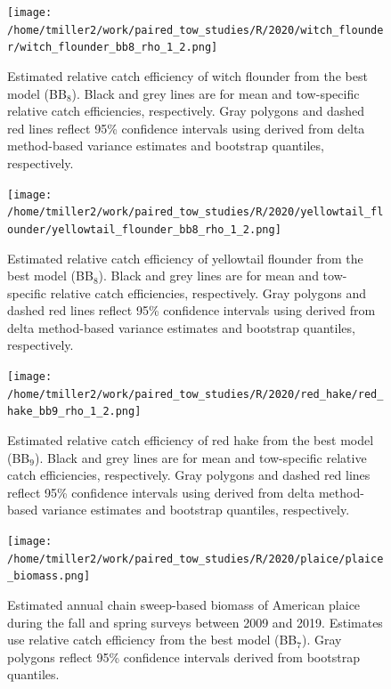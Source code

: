 \documentclass[12pt,letterpaper, leqno]{article}
\begin{document}
\begin{landscape}
\begin{figure}
\caption{Estimated relative catch efficiency of witch flounder from the best model (BB$_8$). Black and grey lines are for mean and tow-specific relative catch efficiencies, respectively. Gray polygons and dashed red lines reflect 95\% confidence intervals using derived from delta method-based variance estimates and bootstrap quantiles, respectively.}\label{combined_rhos_witch}
\begin{center}
\texttt{[image: /home/tmiller2/work/paired\_tow\_studies/R/2020/witch\_flounder/witch\_flounder\_bb8\_rho\_1\_2.png]}
\end{center}
\end{figure}

\begin{figure}
\caption{Estimated relative catch efficiency of yellowtail flounder from the best model (BB$_8$). Black and grey lines are for mean and tow-specific relative catch efficiencies, respectively. Gray polygons and dashed red lines reflect 95\% confidence intervals using derived from delta method-based variance estimates and bootstrap quantiles, respectively.}\label{combined_rhos_ytf}
\begin{center}
\texttt{[image: /home/tmiller2/work/paired\_tow\_studies/R/2020/yellowtail\_flounder/yellowtail\_flounder\_bb8\_rho\_1\_2.png]}
\end{center}
\end{figure}

\begin{figure}
\caption{Estimated relative catch efficiency of red hake from the best model (BB$_9$). Black and grey lines are for mean and tow-specific relative catch efficiencies, respectively. Gray polygons and dashed red lines reflect 95\% confidence intervals using derived from delta method-based variance estimates and bootstrap quantiles, respectively.}\label{combined_rhos_redhake}
\begin{center}
\texttt{[image: /home/tmiller2/work/paired\_tow\_studies/R/2020/red\_hake/red\_hake\_bb9\_rho\_1\_2.png]}
\end{center}
\end{figure}
\end{landscape}

\begin{figure}
\caption{Estimated annual chain sweep-based biomass of American plaice during the fall and spring surveys between 2009 and 2019. Estimates use relative catch efficiency from the best model (BB$_7$). Gray polygons reflect 95\% confidence intervals derived from bootstrap quantiles.}\label{plaice_biomass}
\begin{center}
\texttt{[image: /home/tmiller2/work/paired\_tow\_studies/R/2020/plaice/plaice\_biomass.png]}
\end{center}
\end{figure}
\end{document}
